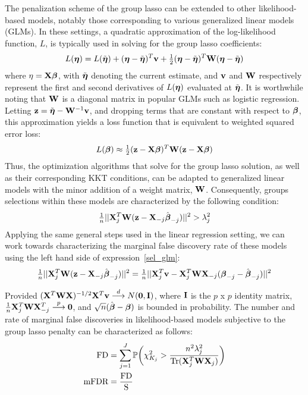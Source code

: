 The penalization scheme of the group lasso can be extended to other likelihood-based models, notably those corresponding to various generalized linear models (GLMs).  In these settings, a quadratic approximation of the log-likelihood function, $L$, is typically used in solving for the group lasso coefficients:
\begin{equation}
L(\boldsymbol{\eta}) = L(\tilde{\boldsymbol{\eta}}) + (\boldsymbol{\eta} - \tilde{\boldsymbol{\eta}})^T\mathbf{v} + \tfrac{1}{2}(\boldsymbol{\eta} - \tilde{\boldsymbol{\eta}})^T\mathbf{W}(\boldsymbol{\eta} - \tilde{\boldsymbol{\eta}})
\end{equation}
where $\eta = \mathbf{X}\boldsymbol{\beta}$, with $\tilde{\boldsymbol{\eta}}$ denoting the current estimate, and $\mathbf{v}$ and $\mathbf{W}$ respectively represent the first and second derivatives of $L(\boldsymbol{\eta})$ evaluated at $\tilde{\boldsymbol{\eta}}$.  It is worthwhile noting that $\mathbf{W}$ is a diagonal matrix in popular GLMs such as logistic regression.  Letting $\mathbf{z} = \tilde{\boldsymbol{\eta}} - \mathbf{W}^{-1}\mathbf{v}$, and dropping terms that are constant with respect to $\boldsymbol{\beta}$, this approximation yields a loss function that is equivalent to weighted squared error loss:
\begin{equation}
L(\boldsymbol{\beta}) \approx \tfrac{1}{2}(\mathbf{z} - \mathbf{X}\boldsymbol{\beta})^T\mathbf{W}(\mathbf{z} - \mathbf{X}\boldsymbol{\beta})
\end{equation}
Thus, the optimization algorithms that solve for the group lasso solution, as well as their corresponding KKT conditions, can be adapted to generalized linear models with the minor addition of a weight matrix, $\mathbf{W}$. Consequently, groups selections within these models are characterized by the following condition:
\begin{equation}
  \label{eq:sel_glm}
\tfrac{1}{n}||\mathbf{X}_j^T\mathbf{W}(\mathbf{z} - \mathbf{X}_{-j}\hat{\boldsymbol{\beta}}_{-j})||^2 > \lambda_j^2
\end{equation}
Applying the same general steps used in the linear regression setting, we can work towards characterizing the marginal false discovery rate of these models using the left hand side of expression~\ref{sel_glm}:
\begin{equation}
  \label{eq:Mfdr_proof_glm}
\tfrac{1}{n}||\mathbf{X}_j^T\mathbf{W}(\mathbf{z} - \mathbf{X}_{-j}\hat{\boldsymbol{\beta}}_{-j})||^2 = \tfrac{1}{n}||\mathbf{X}_j^T\mathbf{v} - \mathbf{X}_j^T\mathbf{W}\mathbf{X}_{-j}(\boldsymbol{\beta}_{-j} - \hat{\boldsymbol{\beta}}_{-j})||^2 
\end{equation}

\begin{prop}
\label{prop1}
Provided $(\mathbf{X}^T\mathbf{W}\mathbf{X})^{-1/2}\mathbf{X}^T\mathbf{v} \overset{d}{\longrightarrow} N(\mathbf{0}, \mathbf{I})$, where $\mathbf{I}$ is the $p$ x $p$ identity matrix,  $\tfrac{1}{n}\mathbf{X}_j^T \mathbf{W} \mathbf{X}_{-j}^T \overset{p}{\longrightarrow} \mathbf{0}$, and $\sqrt{n}(\hat{\boldsymbol{\beta}}-  \boldsymbol{\beta})$ is bounded in probability.  The number and rate of marginal false discoveries in likelihood-based models subjective to the group lasso penalty can be characterized as follows:
\begin{align}
  \label{eq:Mfdr_glm}
  \begin{alignedat}{2}
\textrm{FD} &= \sum_{j = 1}^{J} \mathbb{P} \bigg(\chi^2_{K_j} > \frac{n^2\lambda_j^2}{\operatorname{Tr}(\mathbf{X}_j^T\mathbf{W}\mathbf{X}_j)}\bigg)\\
\textrm{mFDR}  &= \frac{\textrm{FD}}{\text{S}} 
  \end{alignedat}
\end{align}
\end{prop}

